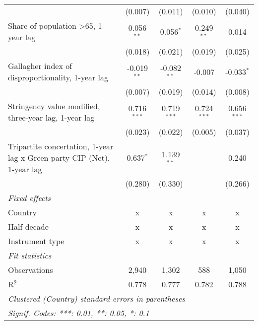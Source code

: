 \begin{table}[htbp]
\begin{tabular}{lcccc}
                                                                              & (0.007)       & (0.011)         & (0.010)         & (0.040)\\   
      Share of population >65, 1-year lag                                     & 0.056$^{**}$  & 0.056$^{*}$     & 0.249$^{**}$    & 0.014\\   
                                                                              & (0.018)       & (0.021)         & (0.019)         & (0.025)\\   
      Gallagher index of disproportionality, 1-year lag                       & -0.019$^{**}$ & -0.082$^{**}$   & -0.007          & -0.033$^{*}$\\   
                                                                              & (0.007)       & (0.019)         & (0.014)         & (0.008)\\   
      Stringency value modified, three-year lag, 1-year lag                   & 0.716$^{***}$ & 0.719$^{***}$   & 0.724$^{***}$   & 0.656$^{***}$\\   
                                                                              & (0.023)       & (0.022)         & (0.005)         & (0.037)\\   
      Tripartite concertation, 1-year lag x Green party CIP (Net), 1-year lag & 0.637$^{*}$   & 1.139$^{**}$    &                 & 0.240\\   
                                                                              & (0.280)       & (0.330)         &                 & (0.266)\\   
      \emph{Fixed effects}\\
      Country                                                                 & x             & x               & x               & x\\  
      Half decade                                                             & x             & x               & x               & x\\  
      Instrument type                                                         & x             & x               & x               & x\\  
      \midrule \emph{Fit statistics}\\
      Observations                                                            & 2,940         & 1,302           & 588             & 1,050\\  
      R$^2$                                                                   & 0.778         & 0.777           & 0.782           & 0.788\\  
      \midrule
      \multicolumn{5}{l}{\emph{Clustered (Country) standard-errors in parentheses}}\\
      \multicolumn{5}{l}{\emph{Signif. Codes: ***: 0.01, **: 0.05, *: 0.1}}\\
   \end{tabular}
\end{table}


